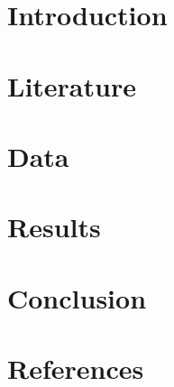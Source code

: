 \documentclass{article}
\begin{document}



\maketitle






\pagebreak




\section{Introduction}






\section{Literature}





\section{Data}




\section{Results}






\section{Conclusion}





\section*{References}



\end{document}
